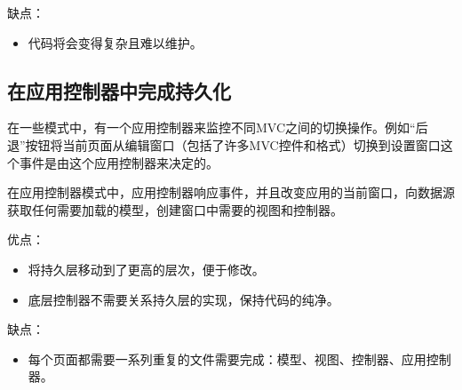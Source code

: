 缺点：
\begin{itemize}
  \item 代码将会变得复杂且难以维护。
\end{itemize}


\subsection{在应用控制器中完成持久化}
在一些模式中，有一个应用控制器来监控不同MVC之间的切换操作。例如``后退''按钮将当前页面从编辑窗口（包括了许多MVC控件和格式）切换到设置窗口这个事件是由这个应用控制器来决定的。

在应用控制器模式中，应用控制器响应事件，并且改变应用的当前窗口，向数据源获取任何需要加载的模型，创建窗口中需要的视图和控制器。

优点：
\begin{itemize}
  \item 将持久层移动到了更高的层次，便于修改。
  \item 底层控制器不需要关系持久层的实现，保持代码的纯净。
\end{itemize}

缺点：
\begin{itemize}
  \item 每个页面都需要一系列重复的文件需要完成：模型、视图、控制器、应用控制器。
\end{itemize}
